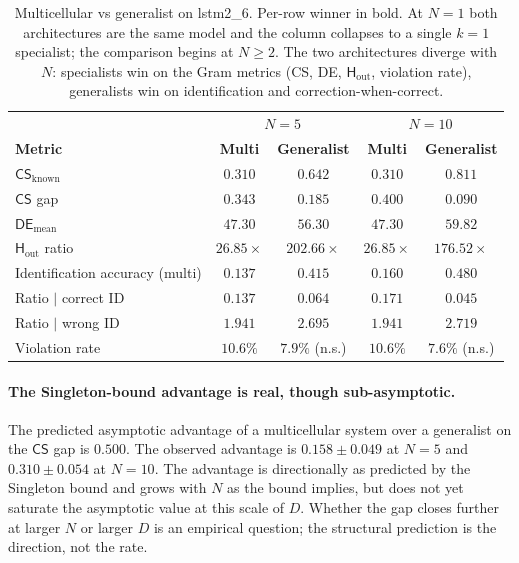 \documentclass[11pt,a4paper]{article}
\newcommand{\CS}{\mathsf{CS}}
\newcommand{\DE}{\mathsf{DE}}
\newcommand{\Hout}{\mathsf{H}_{\mathrm{out}}}
\begin{document}
\begin{table}[H]
\centering
\caption{Multicellular vs generalist on lstm2\_6. Per-row winner in bold. At $N = 1$ both architectures are the same model and the column collapses to a single $k = 1$ specialist; the comparison begins at $N \geq 2$. The two architectures diverge with $N$: specialists win on the Gram metrics (CS, DE, $\Hout$, violation rate), generalists win on identification and correction-when-correct.}
\label{tab:modular-main}
\renewcommand{\arraystretch}{1.3}
\vspace{4pt}
\begin{tabular}{l|cc|cc}
\toprule
& \multicolumn{2}{c|}{$N = 5$}
& \multicolumn{2}{c}{$N = 10$} \\
\textbf{Metric} & \textbf{Multi} & \textbf{Generalist}
                & \textbf{Multi} & \textbf{Generalist} \\
\midrule
$\CS_{\mathrm{known}}$              & $\mathbf{0.310}$  & $0.642$            & $\mathbf{0.310}$  & $0.811$ \\
$\CS$ gap                            & $\mathbf{0.343}$  & $0.185$            & $\mathbf{0.400}$  & $0.090$ \\
$\DE_{\mathrm{mean}}$                & $\mathbf{47.30}$  & $56.30$            & $\mathbf{47.30}$  & $59.82$ \\
$\Hout$ ratio                        & $\mathbf{26.85\times}$ & $202.66\times$ & $\mathbf{26.85\times}$ & $176.52\times$ \\
Identification accuracy (multi)      & $0.137$           & $\mathbf{0.415}$   & $0.160$           & $\mathbf{0.480}$ \\
Ratio $\mid$ correct ID              & $0.137$           & $\mathbf{0.064}$   & $0.171$           & $\mathbf{0.045}$ \\
Ratio $\mid$ wrong ID                & $\mathbf{1.941}$  & $2.695$            & $\mathbf{1.941}$  & $2.719$ \\
Violation rate                       & $\mathbf{10.6\%}$ & $7.9\%$ (n.s.)     & $\mathbf{10.6\%}$ & $7.6\%$ (n.s.) \\
\bottomrule
\end{tabular}
\end{table}

\paragraph{The Singleton-bound advantage is real, though sub-asymptotic.} 
The predicted asymptotic advantage of a multicellular system over a generalist on the $\CS$ gap is $0.500$. The observed advantage is $0.158
\pm 0.049$ at $N = 5$ and $0.310 \pm 0.054$ at $N = 10$. The advantage is directionally as predicted by the Singleton bound and grows with $N$ as the bound implies, but does not yet saturate the asymptotic value at this scale of $D$. Whether the gap closes further at larger $N$ or larger $D$ is an empirical question; the structural prediction is the direction, not the rate.
\end{document}
